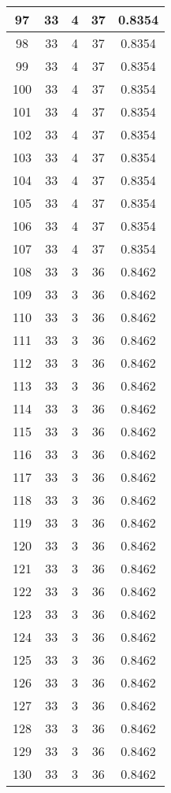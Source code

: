 \documentclass[letterpaper, 12pt]{article}
\begin{document}
\begin{longtable}{|c|c|c|c|c|}
\hline
97 & 33 & 4 & 37 & 0.8354 \\
\hline
98 & 33 & 4 & 37 & 0.8354 \\
\hline
99 & 33 & 4 & 37 & 0.8354 \\
\hline
100 & 33 & 4 & 37 & 0.8354 \\
\hline
101 & 33 & 4 & 37 & 0.8354 \\
\hline
102 & 33 & 4 & 37 & 0.8354 \\
\hline
103 & 33 & 4 & 37 & 0.8354 \\
\hline
104 & 33 & 4 & 37 & 0.8354 \\
\hline
105 & 33 & 4 & 37 & 0.8354 \\
\hline
106 & 33 & 4 & 37 & 0.8354 \\
\hline
107 & 33 & 4 & 37 & 0.8354 \\
\hline
108 & 33 & 3 & 36 & 0.8462 \\
\hline
109 & 33 & 3 & 36 & 0.8462 \\
\hline
110 & 33 & 3 & 36 & 0.8462 \\
\hline
111 & 33 & 3 & 36 & 0.8462 \\
\hline
112 & 33 & 3 & 36 & 0.8462 \\
\hline
113 & 33 & 3 & 36 & 0.8462 \\
\hline
114 & 33 & 3 & 36 & 0.8462 \\
\hline
115 & 33 & 3 & 36 & 0.8462 \\
\hline
116 & 33 & 3 & 36 & 0.8462 \\
\hline
117 & 33 & 3 & 36 & 0.8462 \\
\hline
118 & 33 & 3 & 36 & 0.8462 \\
\hline
119 & 33 & 3 & 36 & 0.8462 \\
\hline
120 & 33 & 3 & 36 & 0.8462 \\
\hline
121 & 33 & 3 & 36 & 0.8462 \\
\hline
122 & 33 & 3 & 36 & 0.8462 \\
\hline
123 & 33 & 3 & 36 & 0.8462 \\
\hline
124 & 33 & 3 & 36 & 0.8462 \\
\hline
125 & 33 & 3 & 36 & 0.8462 \\
\hline
126 & 33 & 3 & 36 & 0.8462 \\
\hline
127 & 33 & 3 & 36 & 0.8462 \\
\hline
128 & 33 & 3 & 36 & 0.8462 \\
\hline
129 & 33 & 3 & 36 & 0.8462 \\
\hline
130 & 33 & 3 & 36 & 0.8462 \\

\end{longtable}
\end{document}
